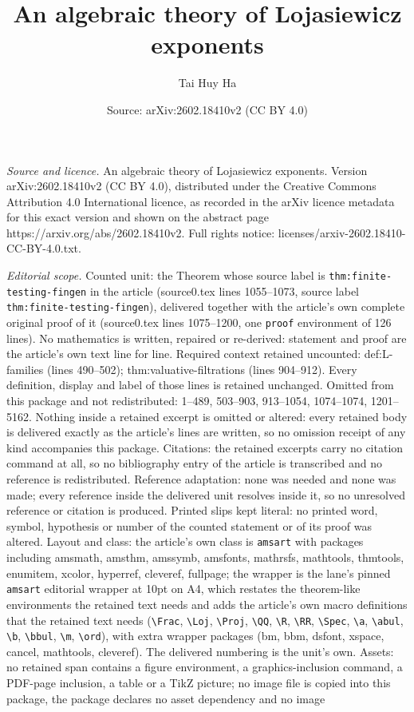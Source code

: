 \documentclass[10pt,a4paper]{amsart}
\title[An algebraic theory of Lojasiewicz exponents]{An algebraic theory of Lojasiewicz exponents}
\author{Tai Huy Ha}
\date{Source: arXiv:2602.18410v2 (CC BY 4.0)}
\begin{document}
\maketitle

\noindent\emph{Source and licence.} An algebraic theory of Lojasiewicz exponents. Version arXiv:2602.18410v2 (CC BY 4.0), distributed under the Creative Commons Attribution 4.0 International licence, as recorded in the arXiv licence metadata for this exact version and shown on the abstract page https://arxiv.org/abs/2602.18410v2. Full rights notice: licenses/arxiv-2602.18410-CC-BY-4.0.txt.\par\smallskip

\noindent\textit{Editorial scope.} Counted unit: the Theorem whose source label is \texttt{thm:finite-testing-fingen} in the article (source0.tex lines 1055--1073, source label \texttt{thm:finite-testing-fingen}), delivered together with the article's own complete original proof of it (source0.tex lines 1075--1200, one \texttt{proof} environment of 126 lines). No mathematics is written, repaired or re-derived: statement and proof are the article's own text line for line. Required context retained uncounted: def:L-families (lines 490--502); thm:valuative-filtrations (lines 904--912). Every definition, display and label of those lines is retained unchanged. Omitted from this package and not redistributed: 1--489, 503--903, 913--1054, 1074--1074, 1201--5162. Nothing inside a retained excerpt is omitted or altered: every retained body is delivered exactly as the article's lines are written, so no omission receipt of any kind accompanies this package. Citations: the retained excerpts carry no citation command at all, so no bibliography entry of the article is transcribed and no reference is redistributed. Reference adaptation: none was needed and none was made; every reference inside the delivered unit resolves inside it, so no unresolved reference or citation is produced. Printed slips kept literal: no printed word, symbol, hypothesis or number of the counted statement or of its proof was altered. Layout and class: the article's own class is \texttt{amsart} with packages including amsmath, amsthm, amssymb, amsfonts, mathrsfs, mathtools, thmtools, enumitem, xcolor, hyperref, cleveref, fullpage; the wrapper is the lane's pinned \texttt{amsart} editorial wrapper at 10pt on A4, which restates the theorem-like environments the retained text needs and adds the article's own macro definitions that the retained text needs (\texttt{\textbackslash Frac}, \texttt{\textbackslash Loj}, \texttt{\textbackslash Proj}, \texttt{\textbackslash QQ}, \texttt{\textbackslash R}, \texttt{\textbackslash RR}, \texttt{\textbackslash Spec}, \texttt{\textbackslash a}, \texttt{\textbackslash abul}, \texttt{\textbackslash b}, \texttt{\textbackslash bbul}, \texttt{\textbackslash m}, \texttt{\textbackslash ord}), with extra wrapper packages (bm, bbm, dsfont, xspace, cancel, mathtools, cleveref). The delivered numbering is the unit's own. Assets: no retained span contains a figure environment, a graphics-inclusion command, a PDF-page inclusion, a table or a TikZ picture; no image file is copied into this package, the package declares no asset dependency and no image 
\end{document}

